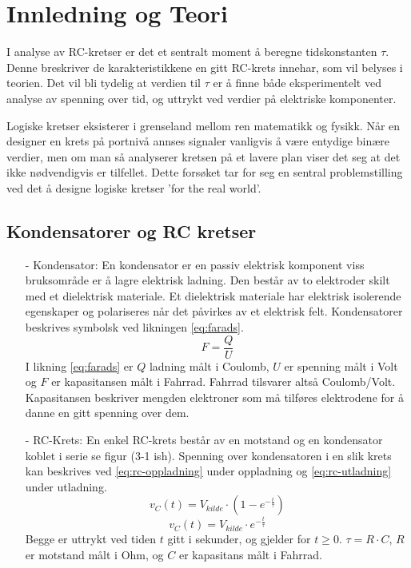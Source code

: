 \section{Innledning og Teori}

    I analyse av RC-kretser er det et sentralt moment å beregne tidskonstanten $\tau$.
    Denne breskriver de karakteristikkene en gitt RC-krets innehar, som vil belyses i teorien.
    Det vil bli tydelig at verdien til $\tau$ er å finne både eksperimentelt ved analyse av spenning over tid, og uttrykt ved verdier på elektriske komponenter.

    Logiske kretser eksisterer i grenseland mellom ren matematikk og fysikk.
    Når en designer en krets på portnivå annses signaler vanligvis å være entydige binære verdier, men om man så analyserer kretsen på et lavere plan viser det seg at det ikke nødvendigvis er tilfellet.
    Dette forsøket tar for seg en sentral problemstilling ved det å designe logiske kretser 'for the real world'.

\subsection{Kondensatorer og RC kretser}

    \begin{itemize}
        \item[-] Kondensator: En kondensator er en passiv elektrisk komponent viss bruksområde er å lagre elektrisk ladning.
        Den består av to elektroder skilt med et dielektrisk materiale.
        Et dielektrisk materiale har elektrisk isolerende egenskaper og polariseres når det påvirkes av et elektrisk felt.
        Kondensatorer beskrives symbolsk ved likningen \ref{eq:farads}.
        \begin{equation}
            F = \frac{Q}{U}
            \label{eq:farads}
        \end{equation}
        I likning \ref{eq:farads} er $Q$ ladning målt i Coulomb, $U$ er spenning målt i Volt og $F$ er kapasitansen målt i Fahrrad.
        Fahrrad tilsvarer altså Coulomb/Volt.
        Kapasitansen beskriver mengden elektroner som må tilføres elektrodene for å danne en gitt spenning over dem.
        \item[-] RC-Krets: En enkel RC-krets består av en motstand og en kondensator koblet i serie se figur (3-1 ish).
        Spenning over kondensatoren i en slik krets kan beskrives ved \ref{eq:rc-oppladning} under oppladning og \ref{eq:rc-utladning} under utladning.
        \begin{equation}
            v_{C}(t) = V_{kilde} \cdot \left( 1 - e^{-\frac{t}{\tau}} \right)
            \label{eq:rc-oppladning}
        \end{equation}
        \begin{equation}
            v_{C}(t) = V_{kilde} \cdot e^{-\frac{t}{\tau}}
            \label{eq:rc-utladning}
        \end{equation}
        Begge er uttrykt ved tiden $t$ gitt i sekunder, og gjelder for $t \geq 0$.
        $\tau = R \cdot C$, $R$ er motstand målt i Ohm, og $C$ er kapasitans målt i Fahrrad.
    \end{itemize}

